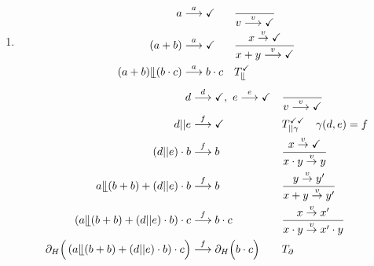 \documentclass[a4paper]{scrartcl}
\newcommand{\too}{\longrightarrow}
\begin{document}
\begin{enumerate}
    \item
        \begin{align}
                a &\stackrel{a}{\too} \checkmark & &\frac{}{v \stackrel{v}{\too} \checkmark} \\
                (a + b) &\stackrel{a}{\too} \checkmark & &\frac{x \stackrel{v}{\to} \checkmark}{x + y \stackrel{v}{\too} \checkmark} \\
                (a + b) \llfloor (b \cdot c) &\stackrel{a}{\too} b \cdot c & &T_\llfloor^\checkmark \\
        \end{align}
        \begin{align}
                d &\stackrel{d}{\too} \checkmark ,\ e \stackrel{e}{\too} \checkmark & &\frac{}{v \stackrel{v}{\too} \checkmark} \\
                d||e &\stackrel{f}{\too} \checkmark & &T_{||\gamma}^{\checkmark\checkmark} \quad \gamma(d,e) = f \\
                (d||e) \cdot b &\stackrel{f}{\too} b & &\frac{x \stackrel{v}{\to} \checkmark}{x \cdot y \stackrel{v}{\to} y} \\
                a \llfloor (b + b) + (d||e) \cdot b &\stackrel{f}{\too} b & &\frac{y \stackrel{v}{\to} y'}{x + y \stackrel{v}{\to} y'} \\
                \left( a \llfloor (b + b) + (d||e) \cdot b \right) \cdot c &\stackrel{f}{\too} b \cdot c & &\frac{x \stackrel{v}{\to} x'}{x \cdot y \stackrel{v}{\to} x' \cdot y} \\
                \partial_H \Big( \left( a \llfloor (b + b) + (d||e) \cdot b \right) \cdot c \Big) &\stackrel{f}{\too} \partial_H \Big( b \cdot c \Big) & &T_\partial
        \end{align}


\end{enumerate}
\end{document}
